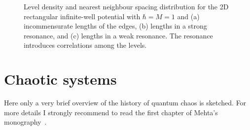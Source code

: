 \documentclass[a4paper,11pt,twoside]{article}
\begin{document}
\begin{solution}
            \begin{figure}[!htbp]
                \begin{subfigure}{0.49\linewidth}
                    \centering{}
                \end{subfigure}
                \hfill
                \begin{subfigure}{0.49\linewidth}
                    \centering{}
                \end{subfigure}
                \begin{subfigure}{0.49\linewidth}
                    \centering{}
                \end{subfigure}
                \hfill
                \begin{subfigure}{0.49\linewidth}
                    \centering{}
                \end{subfigure}
                \hfill
                \begin{subfigure}{0.98\linewidth}
                    \centering{}
                \end{subfigure}
                \hfill
                \caption{
                    \protect\small
                    Level density and nearest neighbour spacing distribution for the 2D rectangular infinite-well potential with $\hbar=M=1$ and (a) incommensurate lengths of the edges, (b) lengths in a strong resonance, and (c) lengths in a weak resonance.
                    The resonance introduces correlations among the levels.
                }	
                \label{fig:2Dbox}
            \end{figure}

        \end{solution}

\section{Chaotic systems}
    Here only a very brief overview of the history of quantum chaos is sketched.
    For more details I strongly recommend to read the first chapter of Mehta's monography~\cite{Meh04}.
\end{document}
